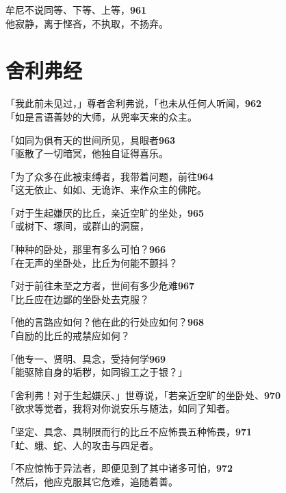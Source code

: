 牟尼不说同等、下等、上等，\hfill{\grayfootnotesize \textbf{961}} \\
他寂静，离于悭吝，不执取，不扬弃。


\section{舍利弗经}


「我此前未见过，」尊者舍利弗说，「也未从任何人听闻，\hfill{\grayfootnotesize \textbf{962}} \\
「如是言语善妙的大师，从兜率天来的众主。


「如同为俱有天的世间所见，具眼者\hfill{\grayfootnotesize \textbf{963}} \\
「驱散了一切暗冥，他独自证得喜乐。


「为了众多在此被束缚者，我带着问题，前往\hfill{\grayfootnotesize \textbf{964}} \\
「这无依止、如如、无诡诈、来作众主的佛陀。


「对于生起嫌厌的比丘，亲近空旷的坐处，\hfill{\grayfootnotesize \textbf{965}} \\
「或树下、塚间，或群山的洞窟，


「种种的卧处，那里有多么可怕？\hfill{\grayfootnotesize \textbf{966}} \\
「在无声的坐卧处，比丘为何能不颤抖？


「对于前往未至之方者，世间有多少危难\hfill{\grayfootnotesize \textbf{967}} \\
「比丘应在边鄙的坐卧处去克服？


「他的言路应如何？他在此的行处应如何？\hfill{\grayfootnotesize \textbf{968}} \\
「自励的比丘的戒禁应如何？


「他专一、贤明、具念，受持何学\hfill{\grayfootnotesize \textbf{969}} \\
「能驱除自身的垢秽，如同锻工之于银？」


「舍利弗！对于生起嫌厌、」世尊说，「若亲近空旷的坐卧处、\hfill{\grayfootnotesize \textbf{970}} \\
「欲求等觉者，我将对你说安乐与随法，如同了知者。


「坚定、具念、具制限而行的比丘不应怖畏五种怖畏，\hfill{\grayfootnotesize \textbf{971}} \\
「虻、蛾、蛇、人的攻击与四足者。


「不应惊怖于异法者，即便见到了其中诸多可怕，\hfill{\grayfootnotesize \textbf{972}} \\
「然后，他应克服其它危难，追随着善。



